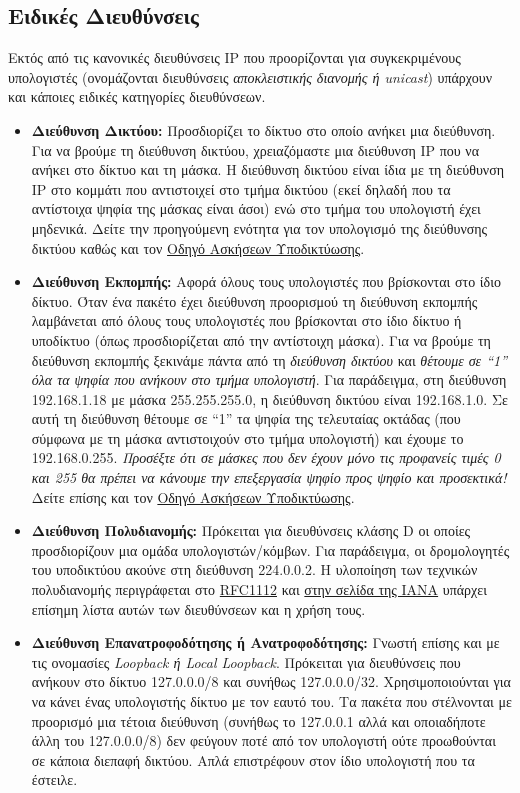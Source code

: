 %
%
\subsection{Ειδικές Διευθύνσεις}
Εκτός από τις κανονικές διευθύνσεις IP που προορίζονται για συγκεκριμένους υπολογιστές (ονομάζονται διευθύνσεις \emph{αποκλειστικής διανομής ή unicast}) υπάρχουν και κάποιες ειδικές κατηγορίες διευθύνσεων.

\begin{itemize}
\item \textbf{Διεύθυνση Δικτύου:} Προσδιορίζει το δίκτυο στο οποίο ανήκει μια διεύθυνση. Για να βρούμε τη διεύθυνση δικτύου, χρειαζόμαστε μια διεύθυνση IP που να ανήκει στο δίκτυο και τη μάσκα. Η διεύθυνση δικτύου είναι ίδια με τη διεύθυνση IP στο κομμάτι που αντιστοιχεί στο τμήμα δικτύου (εκεί δηλαδή που τα αντίστοιχα ψηφία της μάσκας είναι άσοι) ενώ στο τμήμα του υπολογιστή έχει μηδενικά. Δείτε την προηγούμενη ενότητα για τον υπολογισμό της διεύθυνσης δικτύου καθώς και τον \href{http://www.freebsdworld.gr/diktia/subnetting-guide.pdf}{Οδηγό Ασκήσεων Υποδικτύωσης}.
\item \textbf{Διεύθυνση Εκπομπής:} Αφορά όλους τους υπολογιστές που βρίσκονται στο ίδιο δίκτυο. Όταν ένα πακέτο έχει διεύθυνση προορισμού τη διεύθυνση εκπομπής λαμβάνεται από όλους τους υπολογιστές που βρίσκονται στο ίδιο δίκτυο ή υποδίκτυο (όπως προσδιορίζεται από την αντίστοιχη μάσκα). Για να βρούμε τη διεύθυνση εκπομπής ξεκινάμε πάντα από τη \emph{διεύθυνση δικτύου} και \emph{θέτουμε σε ``1'' όλα τα ψηφία που ανήκουν στο τμήμα υπολογιστή}. Για παράδειγμα, στη διεύθυνση 192.168.1.18 με μάσκα 255.255.255.0, η διεύθυνση δικτύου είναι 192.168.1.0. Σε αυτή τη διεύθυνση θέτουμε σε ``1'' τα ψηφία της τελευταίας οκτάδας (που σύμφωνα με τη μάσκα αντιστοιχούν στο τμήμα υπολογιστή) και έχουμε το 192.168.0.255. \emph{Προσέξτε ότι σε μάσκες που δεν έχουν μόνο τις προφανείς τιμές 0 και 255 θα πρέπει να κάνουμε την επεξεργασία ψηφίο προς ψηφίο και προσεκτικά!} Δείτε επίσης και τον \href{http://www.freebsdworld.gr/diktia/subnetting-guide.pdf}{Οδηγό Ασκήσεων Υποδικτύωσης}.
\item \textbf{Διεύθυνση Πολυδιανομής:} Πρόκειται για διευθύνσεις κλάσης D οι οποίες προσδιορίζουν μια ομάδα υπολογιστών/κόμβων. Για παράδειγμα, οι δρομολογητές του υποδικτύου ακούνε στη διεύθυνση 224.0.0.2. Η υλοποίηση των τεχνικών πολυδιανομής περιγράφεται στο \href{https://www.ietf.org/rfc/rfc1112.txt}{RFC1112} και \href{http://www.iana.org/assignments/multicast-addresses/multicast-addresses.xhtml}{στην σελίδα της IANA} υπάρχει επίσημη λίστα αυτών των διευθύνσεων και η χρήση τους. 
\item \textbf{Διεύθυνση Επανατροφοδότησης ή Ανατροφοδότησης:} Γνωστή επίσης και με τις ονομασίες \emph{Loopback ή Local Loopback}. Πρόκειται για διευθύνσεις που ανήκουν στο δίκτυο 127.0.0.0/8 και συνήθως 127.0.0.0/32. Χρησιμοποιούνται για να κάνει ένας υπολογιστής δίκτυο με τον εαυτό του. Τα πακέτα που στέλνονται με προορισμό μια τέτοια διεύθυνση (συνήθως το 127.0.0.1 αλλά και οποιαδήποτε άλλη του 127.0.0.0/8) δεν φεύγουν ποτέ από τον υπολογιστή ούτε προωθούνται σε κάποια διεπαφή δικτύου. Απλά επιστρέφουν στον ίδιο υπολογιστή που τα έστειλε.


\end{itemize}
